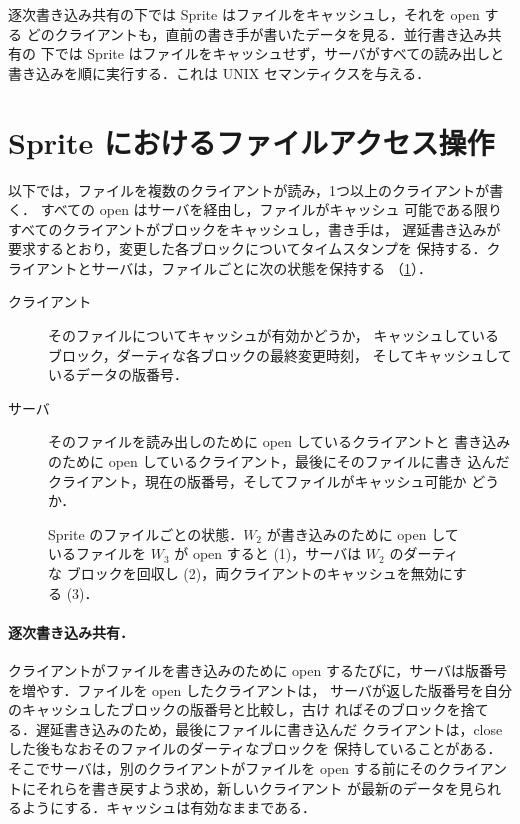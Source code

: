 \documentclass[../main.tex]{subfiles}
\begin{document}
逐次書き込み共有の下では Sprite はファイルをキャッシュし，それを open する
どのクライアントも，直前の書き手が書いたデータを見る．並行書き込み共有の
下では Sprite はファイルをキャッシュせず，サーバがすべての読み出しと
書き込みを順に実行する．これは UNIX セマンティクスを与える．

\section{Sprite におけるファイルアクセス操作}
\label{sec:l14-sprite-ops}

以下では，ファイルを複数のクライアントが読み，1つ以上のクライアントが書く．
すべての open はサーバを経由し，ファイルがキャッシュ
可能である限りすべてのクライアントがブロックをキャッシュし，書き手は，
遅延書き込みが要求するとおり，変更した各ブロックについてタイムスタンプを
保持する．クライアントとサーバは，ファイルごとに次の状態を保持する
（\cref{fig:l14-sprite}）．
\begin{description}
  \item[クライアント] そのファイルについてキャッシュが有効かどうか，
    キャッシュしているブロック，ダーティな各ブロックの最終変更時刻，
    そしてキャッシュしているデータの版番号．
  \item[サーバ] そのファイルを読み出しのために open しているクライアントと
    書き込みのために open しているクライアント，最後にそのファイルに書き
    込んだクライアント，現在の版番号，そしてファイルがキャッシュ可能か
    どうか．
\end{description}

\begin{figure}[htbp]
  \centering
  
  \caption{Sprite のファイルごとの状態．$W_2$ が書き込みのために open して
    いるファイルを $W_3$ が open すると (1)，サーバは $W_2$ のダーティな
    ブロックを回収し (2)，両クライアントのキャッシュを無効にする (3)．}
  \label{fig:l14-sprite}
\end{figure}

\paragraph{逐次書き込み共有．}クライアントがファイルを書き込みのために
open するたびに，サーバは版番号を増やす．ファイルを open したクライアントは，
サーバが返した版番号を自分のキャッシュしたブロックの版番号と比較し，古け
ればそのブロックを捨てる．遅延書き込みのため，最後にファイルに書き込んだ
クライアントは，close した後もなおそのファイルのダーティなブロックを
保持していることがある．そこでサーバは，別のクライアントがファイルを
open する前にそのクライアントにそれらを書き戻すよう求め，新しいクライアント
が最新のデータを見られるようにする．キャッシュは有効なままである．
\end{document}
